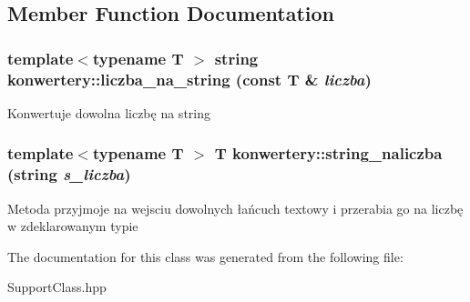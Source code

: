 \subsection{Member Function Documentation}
\hypertarget{classkonwertery_a441339a6d2152a4201334294be9f3abf}{
\subsubsection[{liczba\_\-na\_\-string}]{\setlength{\rightskip}{0pt plus 5cm}template$<$typename T $>$ string konwertery::liczba\_\-na\_\-string (const T \& {\em liczba})}}
\label{classkonwertery_a441339a6d2152a4201334294be9f3abf}
Konwertuje dowolna liczbę na string \hypertarget{classkonwertery_aa69477809e88f575b1f257125731d496}{
\subsubsection[{string\_\-naliczba}]{\setlength{\rightskip}{0pt plus 5cm}template$<$typename T $>$ T konwertery::string\_\-naliczba (string {\em s\_\-liczba})}}
\label{classkonwertery_aa69477809e88f575b1f257125731d496}
Metoda przyjmoje na wejsciu dowolnych łańcuch textowy i przerabia go na liczbę w zdeklarowanym typie 

The documentation for this class was generated from the following file:\begin{DoxyCompactItemize}
\item 
SupportClass.hpp\end{DoxyCompactItemize}
